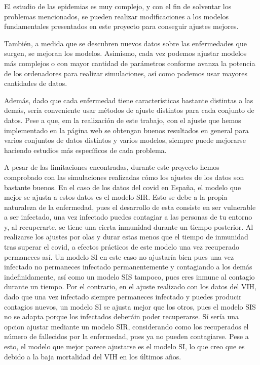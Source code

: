 El estudio de las epidemias es muy complejo, y con el fin de solventar los problemas mencionados, se pueden realizar modificaciones a los modelos fundamentales presentados en este proyecto para conseguir ajustes mejores.

También, a medida que se descubren nuevos datos sobre las enfermedades que surgen, se mejoran los modelos. Asimismo, cada vez podemos ajustar modelos más complejos o con mayor cantidad de parámetros conforme avanza la potencia de los ordenadores para realizar simulaciones, así como podemos usar mayores cantidades de datos.

Además, dado que cada enfermedad tiene características bastante distintas a las demás, sería conveniente usar métodos de ajuste distintos para cada conjunto de datos. Pese a que, em la realización de este trabajo, con el ajuste que hemos implementado en la página web se obtengan buenos resultados en general para varios conjuntos de datos distintos y varios modelos, siempre puede mejorarse haciendo estudios más específicos de cada problema.

A pesar de las limitaciones encontradas, durante este proyecto hemos comprobado con las simulaciones realizadas cómo los ajustes de los datos son bastante buenos. En el caso de los datos del covid en España, el modelo que mejor se ajusta a estos datos es el modelo SIR. Esto se debe a la propia naturaleza de la enfermedad, pues el desarrollo de esta consiste en ser vulnerable a ser infectado, una vez infectado puedes contagiar a las personas de tu entorno y, al recuperarte, se tiene una cierta inmunidad durante un tiempo posterior. Al realizarse los ajustes por olas y durar estas menos que el tiempo de inmunidad tras superar el covid, a efectos prácticos de este modelo una vez recuperado permaneces así. Un modelo SI en este caso no ajustaría bien pues una vez infectado no permaneces infectado permanentemente y contagiando a los demás indefinidamente, así como un modelo SIS tampoco, pues eres inmune al contagio durante un tiempo. Por el contrario, en el ajuste realizado con los datos del VIH, dado que una vez infectado siempre permaneces infectado y puedes producir contagios nuevos, un modelo SI se ajusta mejor que los otros, pues el modelo SIS no se adapta porque los infectados deberáin poder recuperarse. Sí sería una opcion ajustar mediante un modelo SIR, considerando como los recuperados el número de fallecidos por la enfermedad, pues ya no pueden contagiarse. Pese a esto, el modelo que mejor parece ajustarse es el modelo SI, lo que creo que es debido a la baja mortalidad del VIH en los últimos años.

